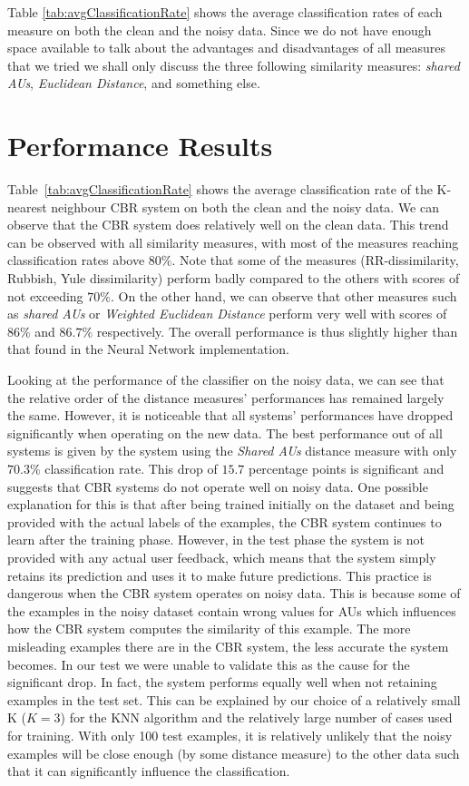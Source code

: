 \documentclass[10pt,a4paper]{article}
\begin{document}
Table \ref{tab:avgClassificationRate} shows the average classification rates of each measure on both the clean and the noisy data. Since we do not have enough space available to talk about the advantages and disadvantages of all measures that we tried we shall only discuss the three following similarity measures: \emph{shared AUs}, \emph{Euclidean Distance}, and something else.

\section{Performance Results}

Table~\ref{tab:avgClassificationRate} shows the average classification rate of the K-nearest neighbour CBR system on both the clean and the noisy data. We can observe that the CBR system does relatively well on the clean data. This trend can be observed with all similarity measures, with most of the measures reaching classification rates above $80\%$. Note that some of the measures (RR-dissimilarity, Rubbish, Yule dissimilarity) perform badly compared to the others with scores of not exceeding $70\%$. On the other hand, we can observe that other measures such as \emph{shared AUs} or \emph{Weighted Euclidean Distance} perform very well with scores of $86\%$ and $86.7\%$ respectively. The overall performance is thus slightly higher than that found in the Neural Network implementation.

Looking at the performance of the classifier on the noisy data, we can see that the relative order of the distance measures' performances has remained largely the same. However, it is noticeable that all systems' performances have dropped significantly when operating on the new data. The best performance out of all systems is given by the system using the \emph{Shared AUs} distance measure with only $70.3\%$ classification rate. This drop of $15.7$ percentage points is significant and suggests that CBR systems do not operate well on noisy data. 
One possible explanation for this is that after being trained initially on the dataset and being provided with the actual labels of the examples, the CBR system continues to learn after the training phase. However, in the test phase the system is not provided with any actual user feedback, which means that the system simply retains its prediction and uses it to make future predictions. This practice is dangerous when the CBR system operates on noisy data. This is because some of the examples in the noisy dataset contain wrong values for AUs which influences how the CBR system computes the similarity of this example. The more misleading examples there are in the CBR system, the less accurate the system becomes. In our test we were unable to validate this as the cause for the significant drop. In fact, the system performs equally well when not retaining examples in the test set. This can be explained by our choice of a relatively small K ($K=3$) for the KNN algorithm and the relatively large number of cases used for training. With only 100 test examples, it is relatively unlikely that the noisy examples will be close enough (by some distance measure) to the other data such that it can significantly influence the classification. 
\end{document}
